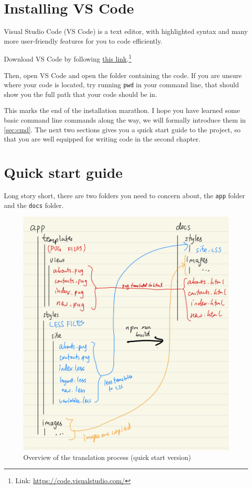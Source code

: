 \section{Installing VS Code}

Visual Studio Code (VS Code) is a text editor, with highlighted syntax and many more user-friendly features for you to code efficiently.

Download VS Code by following \href{https://code.visualstudio.com/}{this link}.\footnote{Link: \url{https://code.visualstudio.com/}}

\label{sec:pwdch1}
Then, open VS Code and open the folder containing the code. If you are unsure where your code is located, try running \texttt{pwd} in your command line, that should show you the full path that your code should be in.

\vspace{6mm}

This marks the end of the installation marathon. I hope you have learned some basic command line commands along the way, we will formally introduce them in \cref{sec:cmd}. The next two sections gives you a quick start guide to the project, so that you are well equipped for writing code in the second chapter.

\section{Quick start guide}
\label{sec:quickstart}

Long story short, there are two folders you need to concern about, the \texttt{app} folder and the \texttt{docs} folder. 

\begin{figure}[h]
\centering
\includegraphics[width=13cm]{images/chn1-half-translation.png}
\caption{Overview of the translation process (quick start version)}
\end{figure}

